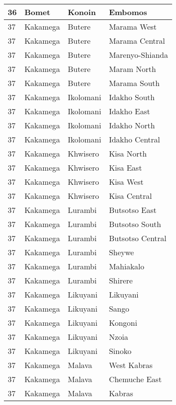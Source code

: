 \begin{table}[!ht]
\begin{tabular}{|l|l|l|l|}
        36 & Bomet & Konoin &  Embomos \\ \hline
        37 & Kakamega & Butere & Marama West \\ \hline
        37 & Kakamega & Butere & Marama Central \\ \hline
        37 & Kakamega & Butere & Marenyo-Shianda \\ \hline
        37 & Kakamega & Butere & Maram North \\ \hline
        37 & Kakamega & Butere & Marama South \\ \hline
        37 & Kakamega & Ikolomani & Idakho South \\ \hline
        37 & Kakamega & Ikolomani & Idakho East \\ \hline
        37 & Kakamega & Ikolomani & Idakho North \\ \hline
        37 & Kakamega & Ikolomani & Idakho Central \\ \hline
        37 & Kakamega & Khwisero & Kisa North \\ \hline
        37 & Kakamega & Khwisero & Kisa East \\ \hline
        37 & Kakamega & Khwisero & Kisa West \\ \hline
        37 & Kakamega & Khwisero & Kisa Central \\ \hline
        37 & Kakamega & Lurambi & Butsotso East \\ \hline
        37 & Kakamega & Lurambi & Butsotso South \\ \hline
        37 & Kakamega & Lurambi & Butsotso Central \\ \hline
        37 & Kakamega & Lurambi & Sheywe \\ \hline
        37 & Kakamega & Lurambi & Mahiakalo \\ \hline
        37 & Kakamega & Lurambi & Shirere \\ \hline
        37 & Kakamega & Likuyani & Likuyani \\ \hline
        37 & Kakamega & Likuyani & Sango \\ \hline
        37 & Kakamega & Likuyani & Kongoni \\ \hline
        37 & Kakamega & Likuyani & Nzoia \\ \hline
        37 & Kakamega & Likuyani & Sinoko \\ \hline
        37 & Kakamega & Malava & West Kabras \\ \hline
        37 & Kakamega & Malava & Chemuche East \\ \hline
        37 & Kakamega & Malava & Kabras \\ \hline

\end{tabular}
\end{table}
